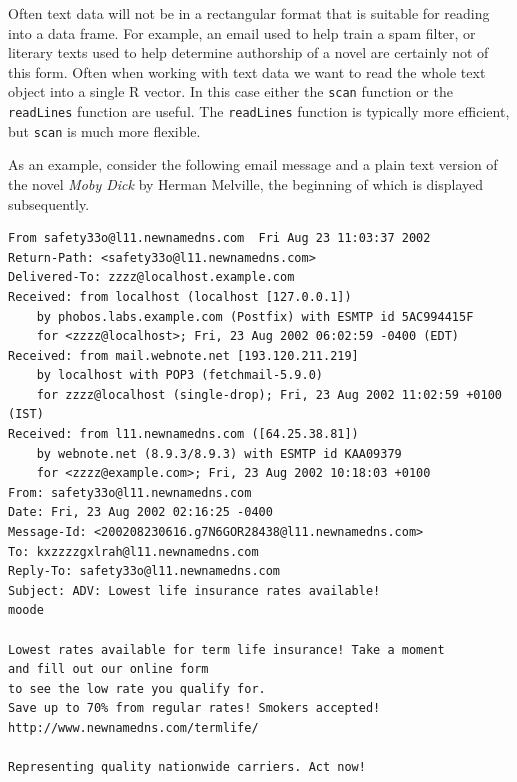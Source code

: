 \documentclass[
]{krantz}
\begin{document}
Often text data will not be in a rectangular format that is suitable for reading into a data frame. For example, an email used to help train a spam filter, or literary texts used to help determine authorship of a novel are certainly not of this form. Often when working with text data we want to read the whole text object into a single R vector. In this case either the \texttt{scan} function or the \texttt{readLines} function are useful. The \texttt{readLines} function is typically more efficient, but \texttt{scan} is much more flexible.

As an example, consider the following email message and a plain text version of the novel \emph{Moby Dick} by Herman Melville, the beginning of which is displayed subsequently.

\begin{verbatim}
From safety33o@l11.newnamedns.com  Fri Aug 23 11:03:37 2002
Return-Path: <safety33o@l11.newnamedns.com>
Delivered-To: zzzz@localhost.example.com
Received: from localhost (localhost [127.0.0.1])
    by phobos.labs.example.com (Postfix) with ESMTP id 5AC994415F
    for <zzzz@localhost>; Fri, 23 Aug 2002 06:02:59 -0400 (EDT)
Received: from mail.webnote.net [193.120.211.219]
    by localhost with POP3 (fetchmail-5.9.0)
    for zzzz@localhost (single-drop); Fri, 23 Aug 2002 11:02:59 +0100 (IST)
Received: from l11.newnamedns.com ([64.25.38.81])
    by webnote.net (8.9.3/8.9.3) with ESMTP id KAA09379
    for <zzzz@example.com>; Fri, 23 Aug 2002 10:18:03 +0100
From: safety33o@l11.newnamedns.com
Date: Fri, 23 Aug 2002 02:16:25 -0400
Message-Id: <200208230616.g7N6GOR28438@l11.newnamedns.com>
To: kxzzzzgxlrah@l11.newnamedns.com
Reply-To: safety33o@l11.newnamedns.com
Subject: ADV: Lowest life insurance rates available!                                                   
moode

Lowest rates available for term life insurance! Take a moment 
and fill out our online form 
to see the low rate you qualify for. 
Save up to 70% from regular rates! Smokers accepted! 
http://www.newnamedns.com/termlife/ 
          
Representing quality nationwide carriers. Act now!
\end{verbatim}
\end{document}
